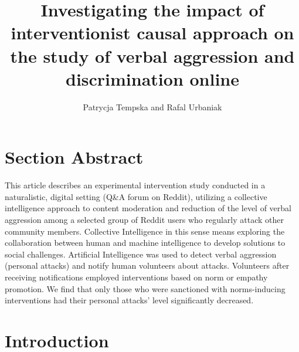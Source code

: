 \documentclass[
  10pt,
  dvipsnames,enabledeprecatedfontcommands]{scrartcl}
\title{Investigating the impact of interventionist causal approach on
the study of verbal aggression and discrimination online}
\author{Patrycja Tempska and Rafal Urbaniak}
\date{}
\begin{document}
\maketitle

\tableofcontents

\hypertarget{section-abstract}{%
\section{Section Abstract}\label{section-abstract}}

This article
describes an experimental intervention study conducted in a
naturalistic, digital setting (Q\&A forum on Reddit), utilizing a
collective intelligence approach to content moderation and reduction of
the level of verbal aggression among a selected group of Reddit users
who regularly attack other community members. Collective Intelligence in
this sense means exploring the collaboration between human and machine
intelligence to develop solutions to social challenges. Artificial
Intelligence was used to detect verbal aggression (personal attacks) and
notify human volunteers about attacks. Volunteers after receiving
notifications employed interventions based on norm or empathy promotion.
We find that only those who were sanctioned with norms-inducing
interventions had their personal attacks' level significantly decreased.

\vspace{1mm}
\footnotesize

\normalsize

\hypertarget{introduction}{%
\section{Introduction}\label{introduction}}
\end{document}
